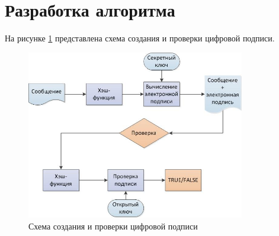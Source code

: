 \section{Разработка алгоритма}

На рисунке \ref{fig:algo} представлена схема создания и проверки цифровой подписи.

\begin{figure}[h!]
	\centering
	\includegraphics[width=0.85\textwidth]{img/RSA.jpeg}
	\caption{Схема создания и проверки цифровой подписи}
	\label{fig:algo}
\end{figure}
\clearpage
